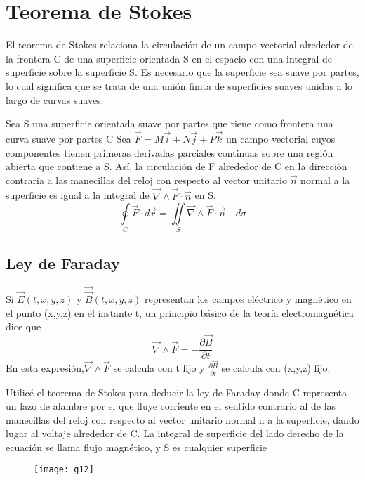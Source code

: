 \documentclass[10pt]{article}
\begin{document}
\section{Teorema de Stokes}
	El teorema de Stokes relaciona la circulación de un campo vectorial alrededor de la frontera C de una superficie orientada S en el espacio con una integral de superficie sobre la superficie S. Es necesario que la superficie sea suave por partes, lo cual significa que se trata de una unión finita de superficies suaves unidas a lo largo de curvas suaves.

	Sea S una superficie orientada suave por partes que tiene como frontera una curva suave por partes C Sea \( \vec{F} = M\vec{i} + N\vec{j} + P\vec{k} \)  un campo vectorial cuyos componentes tienen primeras derivadas parciales continuas sobre una región abierta que contiene a S. Así, la circulación de F alrededor de C en la dirección contraria a las manecillas del reloj con respecto al vector unitario $\vec{n}$ normal a la superficie es igual a la integral de \( \vec{\nabla} \wedge \vec{F} \cdot \vec{n} \) en S.
	\[ \oint \limits_C \vec{F} \cdot d\vec{r} = \iint \limits_S \vec{\nabla} \wedge \vec{F} \cdot \vec{n} \quad d\sigma \]

\subsection{Ley de Faraday}%
	\parindent=0.2in
	\hangindent=0.2in
	Si \( \vec{E}(t,x,y,z) \text{ y } \vec{\vec{B}}(t,x,y,z) \) representan los campos eléctrico y magnético en el punto (x,y,z) en el instante t, un principio básico de la teoría electromagnética dice que
	\[ \vec{\nabla} \wedge \vec{F} = - \frac{\partial \vec{B}}{\partial t} \]
	En esta expresión,\(\vec{\nabla} \wedge \vec{F}\) se calcula con t fijo y \( \frac{\partial \vec{B}}{\partial t} \) se calcula con (x,y,z) fijo.
	
	\parindent=0.2in
	\hangindent=0.2in
	Utilicé el teorema de Stokes para deducir la ley de Faraday donde C representa un lazo de alambre por el que fluye corriente en el sentido contrario al de las manecillas del reloj con respecto al vector unitario normal n a la superficie, dando lugar al voltaje alrededor de C. La integral de superficie del lado derecho de la ecuación se llama flujo magnético, y S es cualquier superficie

	\begin{figure}[h]
	\centering
	\texttt{[image: g12]}
	\end{figure}
\end{document}
